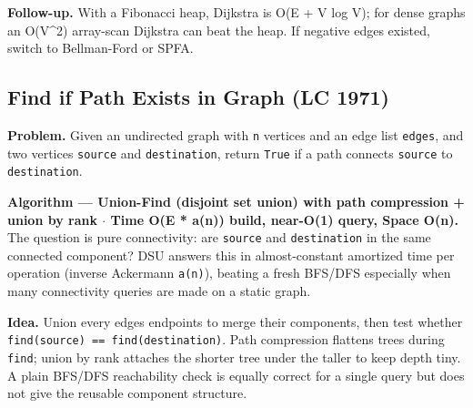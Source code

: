 \documentclass[11pt]{article}
\begin{document}
\textbf{Follow-up.} With a Fibonacci heap, Dijkstra is O(E + V log V); for dense graphs an O(V\^{}2) array-scan Dijkstra can beat the heap. If negative edges existed, switch to Bellman-Ford or SPFA.

\subsection{Find if Path Exists in Graph (LC 1971)}\label{find-if-path-exists-in-graph-lc-1971}

\textbf{Problem.} Given an undirected graph with \texttt{n} vertices and an edge list \texttt{edges}, and two vertices \texttt{source} and \texttt{destination}, return \texttt{True} if a path connects \texttt{source} to \texttt{destination}.

\textbf{Algorithm --- Union-Find (disjoint set union) with path compression + union by rank \(\cdot\) Time O(E * a(n)) build, near-O(1) query, Space O(n).} The question is pure connectivity: are \texttt{source} and \texttt{destination} in the same connected component? DSU answers this in almost-constant amortized time per operation (inverse Ackermann \texttt{a(n)}), beating a fresh BFS/DFS especially when many connectivity queries are made on a static graph.

\textbf{Idea.} Union every edge\textquotesingle s endpoints to merge their components, then test whether \texttt{find(source)\ ==\ find(destination)}. Path compression flattens trees during \texttt{find}; union by rank attaches the shorter tree under the taller to keep depth tiny. A plain BFS/DFS reachability check is equally correct for a single query but does not give the reusable component structure.

\end{document}

